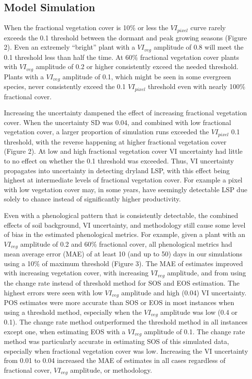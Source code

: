 \documentclass{article}
\begin{document}
\subsection{Model Simulation}

When the fractional vegetation cover is 10\% or less the $VI_{pixel}$ curve rarely exceeds the 0.1 threshold between the dormant and peak growing seasons (Figure 2). Even an extremely “bright” plant with a $VI_{veg}$ amplitude of 0.8 will meet the 0.1 threshold less than half the time. At 60\% fractional vegetation cover plants with $VI_{veg}$ amplitude of 0.2 or higher consistently exceed the needed threshold. Plants with a $VI_{veg}$ amplitude of 0.1, which might be seen in some evergreen species, never consistently exceed the 0.1 $VI_{pixel}$ threshold even with nearly 100\% fractional cover.

Increasing the uncertainty dampened the effect of increasing fractional vegetation cover. When the uncertainty SD was 0.04, and combined with low fractional vegetation cover, a larger proportion of simulation runs exceeded the $VI_{pixel}$ 0.1 threshold, with the reverse happening at higher fractional vegetation cover (Figure 2). At low and high fractional vegetation cover VI uncertainty had little to no effect on whether the 0.1 threshold was exceeded. Thus, VI uncertainty propagates into uncertainty in detecting dryland LSP, with this effect being highest at intermediate levels of fractional vegetation cover. For example a pixel with low vegetation cover may, in some years, have seemingly detectable LSP due solely to chance instead of significantly higher productivity. 

Even with a phenological pattern that is consistently detectable, the combined effects of soil background, VI uncertainty, and methodology still cause some level of bias in the estimated phenological metrics. For example, given a plant with an $VI_{veg}$ amplitude of 0.2 and 60\% fractional cover, all phenological metrics had mean average error (MAE) of at least 10 (and up to 50) days in our simulations using a 10\% of maximum threshold (Figure 3). The MAE of estimates improved with increasing vegetation cover, with increasing $VI_{veg}$ amplitude, and from using the change rate instead of threshold method for SOS and EOS estimation. The highest errors were seen with low $VI_{veg}$ amplitude and high (0.04) VI uncertainty. POS estimates were more accurate than SOS or EOS in most instances when using a threshold method, especially when the $VI_{veg}$ amplitude was low (0.4 or 0.1). The change rate method outperformed the threshold method in all instances except one, when estimating EOS with a $VI_{veg}$ amplitude of 0.1. The change rate method was particularly accurate in estimating SOS of this simulated data, especially when fractional vegetation cover was low. Increasing the VI uncertainty from 0.01 to 0.04 increased the MAE of estimates in all cases regardless of fractional cover, $VI_{veg}$ amplitude, or methodology.
\end{document}
